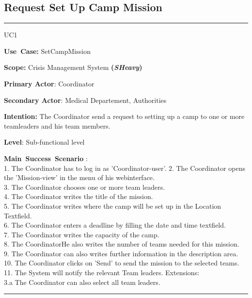 \subsection{Request Set Up Camp Mission}
\vspace{0.5cm}
\hrule
\vspace{0.5cm}
\begin{lyxlist}{UC1}
\small{
\item [\textbf{Use~Case:}] SetCampMission
\item [\textbf{Scope:}] Crisis Management System \textbf{(\emph{SHeavy})}
\item [\textbf{Primary Actor}:] Coordinator
\item [\textbf{Secondary Actor}:] Medical Departement, Authorities
\item [\textbf{Intention:}]The Coordinator send a request to setting up a camp
to one or more teamleaders and his team members.
\item [\textbf{Level}:]Sub-functional level
\item [\textbf{Main~Success~Scenario}]:\\
1. The Coordinator has to log in as 'Coordinator-user'.
2. The Coordinator opens the 'Mission-view' in the menu of his webinterface.\\
3. The Coordinator chooses one or more team leaders.\\
4. The Coordinator writes the title of the mission.\\
5. The Coordinator writes where the camp will be set up in the Location
Textfield.\\
6. The Coordinator enters a deadline by filling the date and time textfield.\\
7. The Coordinator writes the capacity of the camp.\\
8. The CoordinatorHe also writes the number of teams needed for this mission.\\
9. The Coordinator can also writes further information in the description
area.\\
10. The Coordinator clicks on 'Send' to send the mission to the selected
teams.\\ 
11. The System will notify the relevant Team leaders.
Extensions:\\
	3.a The Coordinator can also select all team leaders.\\
}
\end{lyxlist}
\hrule 
\vspace{0.5cm} 

